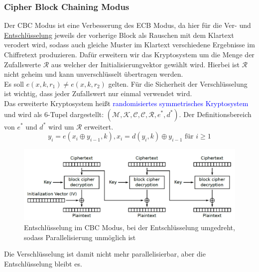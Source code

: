 \documentclass[a4paper,12pt]{article}
\newcommand{\blue}[1]{\textcolor{blue}{#1}}
\begin{document}
\subsubsection{Cipher Block Chaining Modus}
Der CBC Modus ist eine Verbesserung des ECB Modus, da hier für die Ver- und \hyperref[fig:CBCModus]{Entschlüsselung} jeweils der vorherige Block als Rauschen mit dem Klartext verodert wird, sodass auch gleiche Muster im Klartext verschiedene Ergebnisse im Chiffretext produzieren. Dafür erweitern wir das Kryptosystem um die Menge der Zufallswerte $\mathcal{R}$ aus welcher der Initialisierungvektor gewählt wird. Hierbei ist $\mathcal{R}$ nicht geheim und kann unverschlüsselt übertragen werden.\\
Es soll $e(x,k,r_1)\neq e(x,k,r_2)$ gelten. Für die Sicherheit der Verschlüsselung ist wichtig, dass jeder Zufallswert nur einmal verwendet wird.\\
Das erweiterte Kryptosystem heißt \blue{randomisiertes symmetrisches Kryptosystem} und wird als 6-Tupel dargestellt: $(\mathcal{M},\mathcal{K},\mathcal{C},\mathcal{C},\mathcal{R},e^*,d^*)$. Der Definitionsbereich von $e^*$ und $d^*$ wird um $\mathcal{R}$ erweitert.
$$y_i = e(x_i\oplus y_{i-1},k), x_i = d(y_i,k)\oplus y_{i-1} \textrm{ für } i\geq 1$$
\begin{figure}
\centering
\includegraphics[scale=0.5]{Grafiken/CBCModus.png}
\caption{Entschlüsselung im CBC Modus, bei der Entschlüsselung umgedreht, sodass Parallelisierung unmöglich ist}
\label{fig:CBCModus}
\end{figure}
Die Verschlüsselung ist damit nicht mehr parallelisierbar, aber die Entschlüsselung bleibt es.\\
\end{document}
